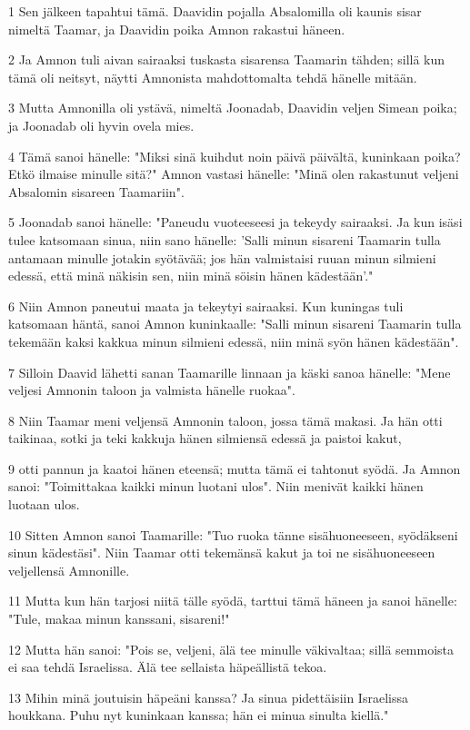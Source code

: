 \par 1 Sen jälkeen tapahtui tämä. Daavidin pojalla Absalomilla oli kaunis sisar nimeltä Taamar, ja Daavidin poika Amnon rakastui häneen.
\par 2 Ja Amnon tuli aivan sairaaksi tuskasta sisarensa Taamarin tähden; sillä kun tämä oli neitsyt, näytti Amnonista mahdottomalta tehdä hänelle mitään.
\par 3 Mutta Amnonilla oli ystävä, nimeltä Joonadab, Daavidin veljen Simean poika; ja Joonadab oli hyvin ovela mies.
\par 4 Tämä sanoi hänelle: "Miksi sinä kuihdut noin päivä päivältä, kuninkaan poika? Etkö ilmaise minulle sitä?" Amnon vastasi hänelle: "Minä olen rakastunut veljeni Absalomin sisareen Taamariin".
\par 5 Joonadab sanoi hänelle: "Paneudu vuoteeseesi ja tekeydy sairaaksi. Ja kun isäsi tulee katsomaan sinua, niin sano hänelle: 'Salli minun sisareni Taamarin tulla antamaan minulle jotakin syötävää; jos hän valmistaisi ruuan minun silmieni edessä, että minä näkisin sen, niin minä söisin hänen kädestään'."
\par 6 Niin Amnon paneutui maata ja tekeytyi sairaaksi. Kun kuningas tuli katsomaan häntä, sanoi Amnon kuninkaalle: "Salli minun sisareni Taamarin tulla tekemään kaksi kakkua minun silmieni edessä, niin minä syön hänen kädestään".
\par 7 Silloin Daavid lähetti sanan Taamarille linnaan ja käski sanoa hänelle: "Mene veljesi Amnonin taloon ja valmista hänelle ruokaa".
\par 8 Niin Taamar meni veljensä Amnonin taloon, jossa tämä makasi. Ja hän otti taikinaa, sotki ja teki kakkuja hänen silmiensä edessä ja paistoi kakut,
\par 9 otti pannun ja kaatoi hänen eteensä; mutta tämä ei tahtonut syödä. Ja Amnon sanoi: "Toimittakaa kaikki minun luotani ulos". Niin menivät kaikki hänen luotaan ulos.
\par 10 Sitten Amnon sanoi Taamarille: "Tuo ruoka tänne sisähuoneeseen, syödäkseni sinun kädestäsi". Niin Taamar otti tekemänsä kakut ja toi ne sisähuoneeseen veljellensä Amnonille.
\par 11 Mutta kun hän tarjosi niitä tälle syödä, tarttui tämä häneen ja sanoi hänelle: "Tule, makaa minun kanssani, sisareni!"
\par 12 Mutta hän sanoi: "Pois se, veljeni, älä tee minulle väkivaltaa; sillä semmoista ei saa tehdä Israelissa. Älä tee sellaista häpeällistä tekoa.
\par 13 Mihin minä joutuisin häpeäni kanssa? Ja sinua pidettäisiin Israelissa houkkana. Puhu nyt kuninkaan kanssa; hän ei minua sinulta kiellä."
